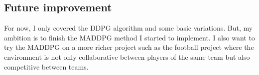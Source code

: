 \documentclass[12pt]{article}
\begin{document}
\subsection{Future improvement}
For now, I only covered the DDPG\cite{LillicrapHPHETS15} algorithm and some basic variations. But, my ambition is to finish the MADDPG method\cite{NIPS20177217} I started to implement. I also want to try the MADDPG on a more richer project such as the football project where the environment is not only collaborative between players of the same team but also competitive between teams.



\end{document}
